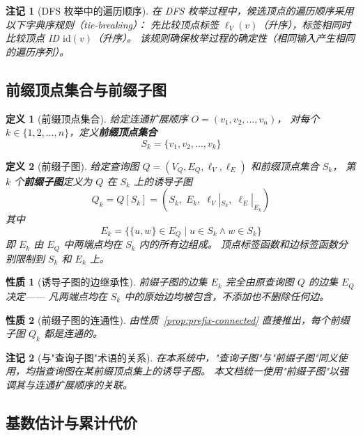 \documentclass[12pt,a4paper]{article}
\newtheorem{definition}{定义}[section]
\newtheorem{property}{性质}[section]
\newtheorem{remark}{注记}[section]
\begin{document}
\begin{remark}[DFS 枚举中的遍历顺序]
\label{rem:dfs-ordering}
在 DFS 枚举过程中，候选顶点的遍历顺序采用以下字典序规则（tie-breaking）：
先比较顶点标签 $\ell_V(v)$（升序），标签相同时比较顶点 ID $\mathrm{id}(v)$（升序）。
该规则确保枚举过程的确定性（相同输入产生相同的遍历序列）。
\end{remark}

\subsection{前缀顶点集合与前缀子图}
\label{sec:formal-prefix}

\begin{definition}[前缀顶点集合]
\label{def:prefix-vertex-set}
给定连通扩展顺序 $O = (v_1, v_2, \dots, v_n)$，
对每个 $k \in \{1, 2, \dots, n\}$，定义\textbf{前缀顶点集合}
\[
  S_k = \{v_1, v_2, \dots, v_k\}
\]
\end{definition}

\begin{definition}[前缀子图]
\label{def:prefix-subgraph}
给定查询图 $Q = (V_Q, E_Q, \ell_V, \ell_E)$ 和前缀顶点集合 $S_k$，
第 $k$ 个\textbf{前缀子图}定义为 $Q$ 在 $S_k$ 上的诱导子图
\[
  Q_k = Q[S_k] = (S_k,\; E_k,\; \ell_V|_{S_k},\; \ell_E|_{E_k})
\]
其中
\[
  E_k = \bigl\{\{u, w\} \in E_Q \;\big|\; u \in S_k \wedge w \in S_k\bigr\}
\]
即 $E_k$ 由 $E_Q$ 中两端点均在 $S_k$ 内的所有边组成。
顶点标签函数和边标签函数分别限制到 $S_k$ 和 $E_k$ 上。
\end{definition}

\begin{property}[诱导子图的边继承性]
前缀子图的边集 $E_k$ 完全由原查询图 $Q$ 的边集 $E_Q$ 决定——
凡两端点均在 $S_k$ 中的原始边均被包含，不添加也不删除任何边。
\end{property}

\begin{property}[前缀子图的连通性]
由性质~\ref{prop:prefix-connected} 直接推出，每个前缀子图 $Q_k$ 都是连通的。
\end{property}

\begin{remark}[与"查询子图"术语的关系]
在本系统中，"查询子图"与"前缀子图"同义使用，均指查询图在某前缀顶点集上的诱导子图。
本文档统一使用"前缀子图"以强调其与连通扩展顺序的关联。
\end{remark}

\subsection{基数估计与累计代价}
\label{sec:formal-score}
\end{document}
